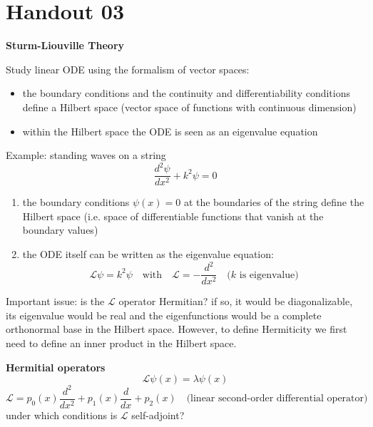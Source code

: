 \documentclass{article}
\begin{document}
\newpage
\section{Handout 03}
\large
\begin{center}
    \textbf{Sturm-Liouville Theory}
\end{center}

\normalsize
\noindent
Study linear ODE using the formalism of vector spaces:
\begin{itemize}
    \item the boundary conditions and the continuity and differentiability conditions define a Hilbert space (vector space of functions with continuous dimension)
    \item within the Hilbert space the ODE is seen as an eigenvalue equation
\end{itemize}
\noindent
Example: standing waves on a string
\begin{equation}
    \frac{d^2 \psi}{dx^2} + k^2 \psi = 0
\end{equation}
\begin{enumerate}
    \item the boundary conditions $\psi(x) = 0$ at the boundaries of the string define the Hilbert space (i.e. space of differentiable functions that vanish at the boundary values)
    \item the ODE itself can be written as the eigenvalue equation:
    \begin{equation}
        \mathcal{L} \psi = k^2 \psi \quad \text{with} \quad \mathcal{L} = -\frac{d^2}{dx^2} \quad (k \text{ is eigenvalue)}
    \end{equation}
\end{enumerate}
Important issue: is the $\mathcal{L}$ operator Hermitian? if so, it would be diagonalizable, its eigenvalue would be real and the eigenfunctions would be a complete orthonormal base in the Hilbert space. However, to define Hermiticity we first need to define an inner product in the Hilbert space.

\vspace{2mm} \noindent
\textbf{Hermitial operators}
\begin{equation}
    \mathcal{L} \psi(x) = \lambda \psi(x)
\end{equation}
\begin{equation}
    \mathcal{L} = p_0(x) \frac{d^2}{dx^2} + p_1(x) \frac{d}{dx} + p_2(x) \quad \text{(linear second-order differential operator)}
\end{equation}
under which conditions is $\mathcal{L}$ self-adjoint?
\end{document}
